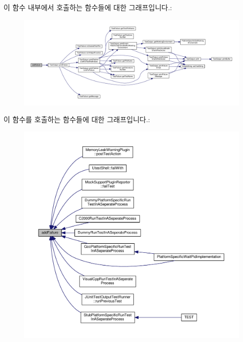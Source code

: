 이 함수 내부에서 호출하는 함수들에 대한 그래프입니다.\+:
\nopagebreak
\begin{figure}[H]
\begin{center}
\leavevmode
\includegraphics[width=350pt]{class_test_result_a72cba7b88c906f8f5af977d360bd8c23_cgraph}
\end{center}
\end{figure}




이 함수를 호출하는 함수들에 대한 그래프입니다.\+:
\nopagebreak
\begin{figure}[H]
\begin{center}
\leavevmode
\includegraphics[width=350pt]{class_test_result_a72cba7b88c906f8f5af977d360bd8c23_icgraph}
\end{center}
\end{figure}


